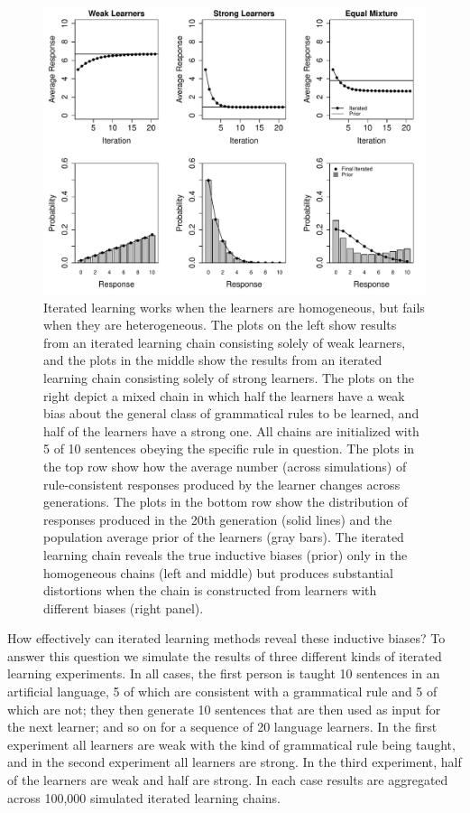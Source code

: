 \documentclass[doc]{apa6}
\begin{document}
\begin{figure}[p]
\begin{center}
\includegraphics[width=15cm]{coinsfail1.pdf} 
\caption{{\small Iterated learning works when the learners are homogeneous, but fails when they are heterogeneous. The plots on the left show results from an iterated learning chain consisting solely of {\sc weak} learners, and the plots in the middle show the results from an iterated learning chain consisting solely of {\sc strong} learners. The plots on the right depict a mixed chain in which half the learners have a {\sc weak} bias about the general class of grammatical rules to be learned, and half of the learners have a {\sc strong} one. All chains are initialized with 5 of 10 sentences obeying the specific rule in question. The plots in the top row show how the average number (across simulations) of rule-consistent responses produced by the learner changes across generations. The plots in the bottom row show the distribution of responses produced in the 20th generation (solid lines) and the population average prior of the learners (gray bars). The iterated learning chain reveals the true inductive biases (prior) only in the homogeneous chains (left and middle) but produces substantial distortions when the chain is constructed from learners with different biases (right panel).}}
\label{coinsfail1}
\end{center}
\end{figure}

How effectively can iterated learning methods reveal these inductive biases? To answer this question we simulate the results of three different kinds of iterated learning experiments. In all cases, the first person is taught 10 sentences in an artificial language, 5 of which are consistent with a grammatical rule and 5 of which are not; they then generate 10 sentences that are then used as input for the next learner; and so on for a sequence of 20 language learners. In the first experiment all learners are {\sc weak} with the kind of grammatical rule being taught, and in the second experiment all learners are {\sc strong}. In the third experiment, half of the learners are {\sc weak} and half are {\sc strong}. In each case results are aggregated across 100,000 simulated iterated learning chains.
\end{document}
